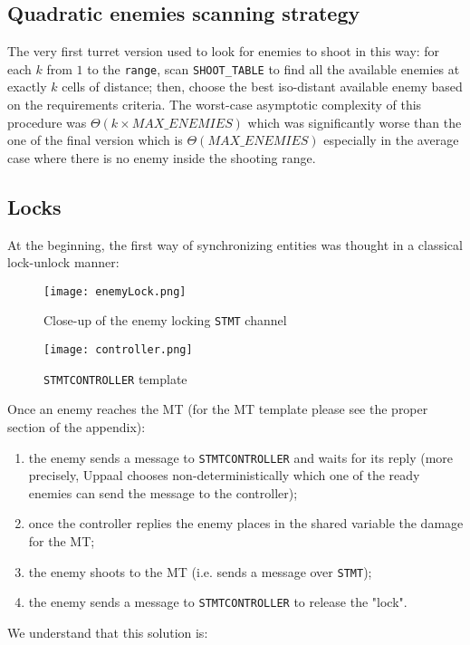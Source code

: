\documentclass[
10pt, %
a4paper, %
oneside, %
headinclude,footinclude, %
BCOR5mm, %
]{scrartcl}
\begin{document}
		\subsection{Quadratic enemies scanning strategy}
			The very first turret version used to look for enemies to shoot in this way: for each $k$ from $1$ to the \texttt{range}, scan \texttt{SHOOT\_TABLE} to find all the available enemies at exactly $k$ cells of distance; then, choose the best iso-distant available enemy based on the requirements criteria. The worst-case asymptotic complexity of this procedure was $\Theta(k\times MAX\_ENEMIES)$ which was significantly worse than the one of the final version which is $\Theta(MAX\_ENEMIES)$ especially in the average case where there is no enemy inside the shooting range.
		\subsection{Locks}
			At the beginning, the first way of synchronizing entities was thought in a classical lock-unlock manner:
			\begin{figure}[h!]
				\centering
				\begin{minipage}{.5\textwidth}
					\centering
					\texttt{[image: enemyLock.png]}
					\caption{Close-up of the enemy locking \texttt{STMT} channel}
				\end{minipage}
				\begin{minipage}{.4\textwidth}
					\centering
					\texttt{[image: controller.png]}
					\caption{\texttt{STMTCONTROLLER} template}
				\end{minipage}
			\end{figure}
			Once an enemy reaches the MT (for the MT template please see the proper section of the appendix):
			\begin{enumerate}
				\item the enemy sends a message to \texttt{STMTCONTROLLER} and waits for its reply (more precisely, Uppaal chooses non-deterministically which one of the ready enemies can send the message to the controller);
				\item once the controller replies the enemy places in the shared variable the damage for the MT;
				\item the enemy shoots to the MT (i.e. sends a message over \texttt{STMT});
				\item the enemy sends a message to \texttt{STMTCONTROLLER} to release the "lock".
			\end{enumerate}
			We understand that this solution is:
\end{document}
